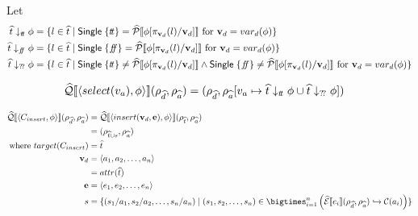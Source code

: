 Let
\begin{align}
    \abstable \downarrow_{\true} \phi &= \{ l \in \ab{t} \mid \mathsf{Single} \; \{ \true \} = \abspredsem{\phi[\pi_{\mathbf{v}_d}(l)/\mathbf{v}_d]} \text{ for } \mathbf{v}_d = var_d(\phi) \} \\
    \abstable \downarrow_{\false} \phi &= \{ l \in \ab{t} \mid \mathsf{Single} \; \{ \false \} = \abspredsem{\phi[\pi_{\mathbf{v}_d}(l)/\mathbf{v}_d]} \text{ for } \mathbf{v}_d = var_d(\phi) \} \\
    \abstable \downarrow_{\unknown} \phi &= \{ l \in \ab{t} \mid \mathsf{Single} \; \{ \true \} \neq \abspredsem{\phi[\pi_{\mathbf{v}_d}(l)/\mathbf{v}_d]} \land \mathsf{Single} \; \{ \false \} \neq \abspredsem{\phi[\pi_{\mathbf{v}_d}(l)/\mathbf{v}_d]} \text{ for } \mathbf{v}_d = var_d(\phi) \}
\end{align}

\begin{align}
    \widehat{\mathcal{Q}}\llbracket \langle select(v_a), \phi \rangle \rrbracket(\rho_{\widehat{d}}, \rho_{\widehat{a}})
    &= (\rho_{\widehat{d}}, \rho_{\widehat{a}}[v_a \mapsto \widehat{t} \downarrow_{t\!t} \phi \cup \widehat{t} \downarrow_{?\!?} \phi])
\end{align}

\begin{align}
    \abssqlsem{\langle C_{insert}, \phi \rangle}(\rho_{\ab{d}}, \rho_{\ab{a}}) & =
    \abssqlsem{\langle insert(\mathbf{v}_d, \mathbf{e}), \phi \rangle}(\rho_{\ab{t}}, \rho_{\ab{a}})\\
    & = (\rho_{\ab{t} \cup s}, \rho_{\ab{a}}) \\
    \text{where } target(C_{insert})        & = \ab{t}                                                                                                                                                 \\
    \mathbf{v}_d              & = \langle a_1, a_2, \dots, a_n \rangle                                                                                                        \\
                                               & = attr(\ab{t})                                                                                                                                           \\
    \mathbf{e} & = \langle e_1, e_2, \dots, e_n \rangle \\
    s &= \{ (s_1/a_1, s_2/a_2, \dots, s_n/a_n) \mid (s_1, s_2, \dots, s_n) \in \bigtimes_{i = 1}^{n} \left( \absexpsem{e_i}(\rho_{\ab{d}}, \rho_{\ab{a}}) \into \lookupcl(a_i) \right) \}
\end{align}


